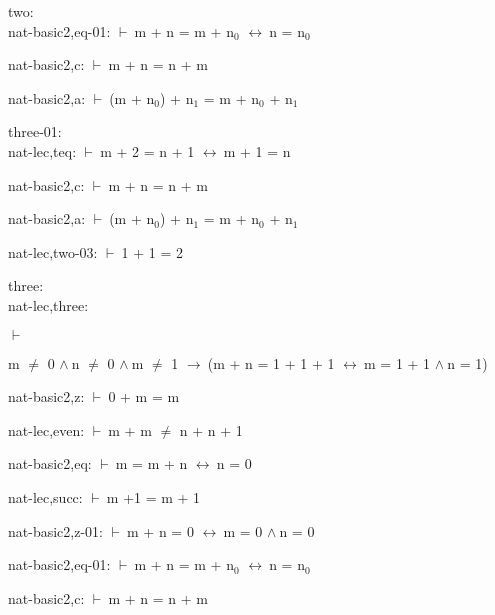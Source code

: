 \documentclass[a4paper]{article}
\newcommand{\Fol}{\mbox{$\vdash\ $}}
\newcommand{\And}{\mbox{$\wedge\ $}}
\newcommand{\Imp}{\mbox{$\rightarrow\ $}}
\newcommand{\Equiv}{\mbox{$\leftrightarrow\ $}}
\begin{document}
\bigskip

two:\\ nat-basic2,eq-01: 
 \Fol m + n = m + $\mbox{n}_{0}$ \Equiv n = $\mbox{n}_{0}$



nat-basic2,c: 
 \Fol m + n = n + m



nat-basic2,a: 
 \Fol (m + $\mbox{n}_{0}$) + $\mbox{n}_{1}$ = m + $\mbox{n}_{0}$ + $\mbox{n}_{1}$



\bigskip

three-01:\\ nat-lec,teq: 
 \Fol m + 2 = n + 1 \Equiv m + 1 = n



nat-basic2,c: 
 \Fol m + n = n + m



nat-basic2,a: 
 \Fol (m + $\mbox{n}_{0}$) + $\mbox{n}_{1}$ = m + $\mbox{n}_{0}$ + $\mbox{n}_{1}$



nat-lec,two-03: 
 \Fol 1 + 1 = 2



\bigskip

three:\\ nat-lec,three: 
\begin{flushleft}


\Fol

m $\neq$ 0 \And n $\neq$ 0 \And m $\neq$ 1 \Imp (m + n = 1 + 1 + 1 \Equiv m = 1 + 1 \And n = 1)

\end{flushleft}

nat-basic2,z: 
 \Fol 0 + m = m



nat-lec,even: 
 \Fol m + m $\neq$ n + n + 1



nat-basic2,eq: 
 \Fol m = m + n \Equiv n = 0



nat-lec,succ: 
 \Fol m +1 = m + 1



nat-basic2,z-01: 
 \Fol m + n = 0 \Equiv m = 0 \And n = 0



nat-basic2,eq-01: 
 \Fol m + n = m + $\mbox{n}_{0}$ \Equiv n = $\mbox{n}_{0}$



nat-basic2,c: 
 \Fol m + n = n + m
\end{document}
